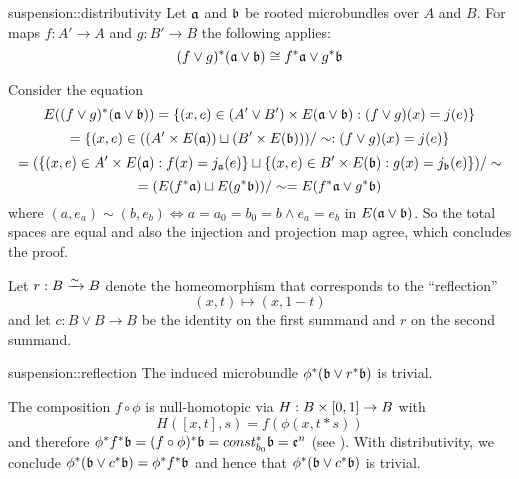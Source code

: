 \begin{mylemma}{suspension::distributivity}
    Let $\mathfrak{a}$ and $\mathfrak{b}$ be rooted microbundles over $A$ and $B$.
    For maps $f: A' \to A$ and $g: B' \to B$ the following applies:
    \[ (f \vee g)^*(\mathfrak{a} \vee \mathfrak{b}) \cong f^*\mathfrak{a} \vee g^*\mathfrak{b} \]
\end{mylemma}

\begin{myproof}
    Consider the equation
    \[ E((f \vee g)^*(\mathfrak{a} \vee \mathfrak{b})) = \{(x, e) \in (A' \vee B') \times E(\mathfrak{a} \vee \mathfrak{b}):(f \vee g)(x) = j(e)\} \]
    \[ = \{(x, e) \in ((A' \times E(\mathfrak{a})) \sqcup (B' \times E(\mathfrak{b}))) / \sim:(f \vee g)(x) = j(e)\} \]
    \[ = (\{(x, e) \in A' \times E(\mathfrak{a}):f(x) = j_{\mathfrak{a}}(e)\} \sqcup \{(x, e) \in B' \times E(\mathfrak{b}):g(x) = j_{\mathfrak{b}}(e)\}) / \sim \]
    \[ = (E(f^*\mathfrak{a}) \sqcup E(g^*\mathfrak{b})) / \sim = E(f^*\mathfrak{a} \vee g^*\mathfrak{b})\]
    where $(a, e_a) \sim (b, e_b) \iff a = a_0 = b_0 = b \land e_a = e_b$ in $E(\mathfrak{a} \vee \mathfrak{b})$.
    So the total spaces are equal and also the injection and projection map agree, which concludes the proof.
\end{myproof}

\begin{myparagraph}
    Let $r: B \xrightarrow{\sim} B$ denote the homeomorphism that corresponds to the ``reflection''
    \[ (x, t) \mapsto (x, 1 - t)\]
    and let $c: B \vee B \to B$ be the identity on the first summand and $r$ on the second summand.
\end{myparagraph}

\begin{mylemma}{suspension::reflection}
    The induced microbundle $\phi^*(\mathfrak{b} \vee r^*\mathfrak{b})$ is trivial.
\end{mylemma}
\begin{myproof}
    The composition $f \circ \phi$ is null-homotopic via $H: B \times [0, 1] \to B$ with
    \[ H([x, t], s) = f(\phi(x, t * s)) \]
    and therefore $\phi^*f^*\mathfrak{b} = (f \circ \phi)^*\mathfrak{b} = const_{b_0}^*\mathfrak{b} = \mathfrak{e}^{n}$ (see ).
    With distributivity, we conclude $\phi^*(\mathfrak{b} \vee c^*\mathfrak{b}) = \phi^*f^*\mathfrak{b}$
    and hence that $\phi^*(\mathfrak{b} \vee c^*\mathfrak{b})$ is trivial.
\end{myproof}